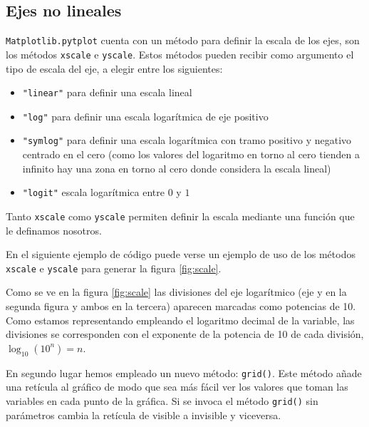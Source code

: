 \begin{paracol}{2}
\subsection{Ejes no lineales}
    \texttt{Matplotlib.pytplot} cuenta con un método para definir la escala de los ejes, son los métodos \texttt{xscale} e \texttt{yscale}. Estos métodos pueden recibir como argumento el tipo de escala del eje, a elegir entre los siguientes:
    \begin{itemize}
        \item \texttt{"linear"} para definir una escala lineal
        \item \texttt{"log"} para definir una escala logarítmica de eje positivo
        \item \texttt{"symlog"} para definir una escala logarítmica con tramo positivo y negativo centrado en el cero (como los valores del logaritmo en torno al cero tienden a infinito hay una zona en torno al cero donde considera la escala lineal)
        \item \texttt{"logit"} escala logarítmica entre $0$ y $1$
    \end{itemize}
    Tanto \texttt{xscale} como \texttt{yscale} permiten definir la escala mediante una función que le definamos nosotros.

    En el siguiente ejemplo de código puede verse un ejemplo de uso de los métodos \texttt{xscale} e \texttt{yscale} para generar la figura \ref{fig:scale}.  
    
    Como se ve en la figura \ref{fig:scale}  las divisiones del eje logarítmico (eje y en la segunda figura y ambos en la tercera) aparecen marcadas como potencias de 10. Como estamos representando empleando el logaritmo decimal de la variable, las divisiones se corresponden con el exponente de la potencia de 10 de cada división, $\log_{10}(10^n)=n$.
    
    En segundo lugar hemos empleado un nuevo método: \texttt{grid()}. Este método añade una retícula al gráfico de modo que sea más fácil ver los valores que toman las variables en cada punto de la gráfica. Si se invoca el método \texttt{grid()} sin parámetros cambia la retícula de visible a invisible y viceversa.


    \switchcolumn

\end{paracol}
